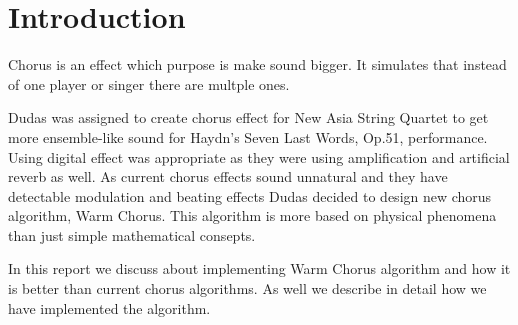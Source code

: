 \section{Introduction}

Chorus is an effect which purpose is make sound bigger. It simulates that
instead of one player or singer there are multple ones. 

Dudas was assigned to create chorus effect for New Asia String Quartet to get more
ensemble-like sound for Haydn's Seven Last Words, Op.51, performance. Using digital effect
was appropriate as they were using amplification and artificial reverb as well. 
As current chorus effects sound unnatural and they have detectable modulation
and beating effects Dudas decided to design new chorus algorithm, Warm Chorus. 
This algorithm is more based on physical phenomena than just simple mathematical 
consepts. \cite{dudas}

In this report we discuss about implementing Warm Chorus algorithm and how it is
better than current chorus algorithms. As well we describe in detail how we have 
implemented the algorithm.